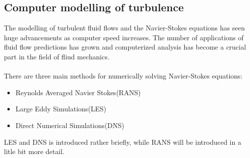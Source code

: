\documentclass[a4paper, 12pt]{report}
\begin{document}
\subsection{Computer modelling of turbulence}
The modelling of turbulent fluid flows and the Navier-Stokes equations has seen huge advancements as computer speed increases. The number of applications of fluid flow predictions has grown and computerized analysis has become a crucial part in the field of fliud mechanics.\\
\\
There are three main methods for numerically solving Navier-Stokes equations:
\begin{itemize}
	\item Reynolds Averaged Navier Stokes(RANS)
	\item  Large Eddy Simulations(LES)
	\item  Direct Numerical Simulations(DNS)
\end{itemize}
LES and DNS is introduced rather briefly, while RANS will be introduced in a litle bit more detail.
\end{document}
